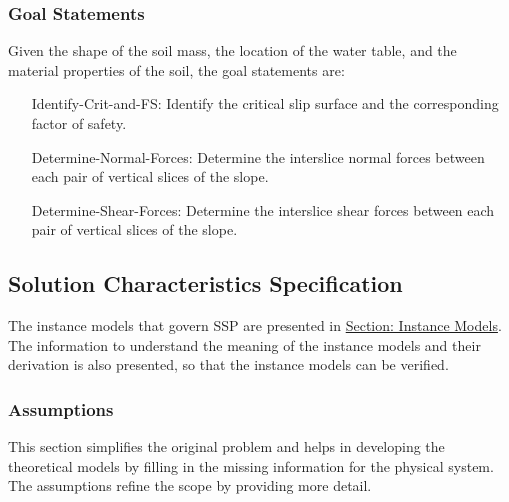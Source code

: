 \documentclass[12pt]{article}
\begin{document}
\subsubsection{Goal Statements}
\label{Sec:GoalStmt}
Given the shape of the soil mass, the location of the water table, and the material properties of the soil, the goal statements are:

\begin{itemize}
\item[Identify-Crit-and-FS:\phantomsection\label{identifyCritAndFS}]{Identify the critical slip surface and the corresponding factor of safety.}
\item[Determine-Normal-Forces:\phantomsection\label{determineNormalF}]{Determine the interslice normal forces between each pair of vertical slices of the slope.}
\item[Determine-Shear-Forces:\phantomsection\label{determineShearF}]{Determine the interslice shear forces between each pair of vertical slices of the slope.}
\end{itemize}
\subsection{Solution Characteristics Specification}
\label{Sec:SolCharSpec}
The instance models that govern SSP are presented in \hyperref[Sec:IMs]{Section: Instance Models}. The information to understand the meaning of the instance models and their derivation is also presented, so that the instance models can be verified.

\subsubsection{Assumptions}
\label{Sec:Assumps}
This section simplifies the original problem and helps in developing the theoretical models by filling in the missing information for the physical system. The assumptions refine the scope by providing more detail.
\end{document}
